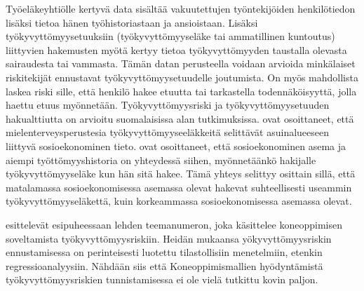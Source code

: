 Työeläkeyhtiölle kertyvä data sisältää vakuutettujen työntekijöiden henkilötiedon lisäksi tietoa hänen työhistoriastaan ja ansioistaan. Lisäksi työkyvyttömyysetuuksiin (työkyvyttömyyseläke tai ammatillinen kuntoutus) liittyvien hakemusten myötä kertyy tietoa työkyvyttömyyden taustalla olevasta sairaudesta tai vammasta. Tämän datan perusteella voidaan arvioida minkälaiset riskitekijät ennustavat työkyvyttömyysetuudelle joutumista. On myös mahdollista laskea riski sille, että henkilö hakee etuutta tai tarkastella todennäköisyyttä, jolla haettu etuus myönnetään. Työkyvyttömyysriski ja työkyvyttömyysetuuden hakualttiutta on arvioitu suomalaisissa alan tutkimuksissa. \citet{karolaakso_contextual_2021, karolaakso_socioeconomic_2020} ovat osoittaneet, että mielenterveysperustesia työkyvyttömyyseeläkkeitä selittävät asuinalueeseen liittyvä sosioekonominen tieto. \citet{perhoniemi_determinants_2020, perhoniemi_tyokyvyttomyyselakehakemusten_2020} ovat osoittaneet, että sosioekonominen asema ja aiempi työttömyyshistoria on yhteydessä siihen, myönnetäänkö hakijalle työkyvyttömyyseläke kun hän sitä hakee. Tämä yhteys selittyy osittain sillä, että matalamassa sosioekonomisessa asemassa olevat hakevat suhteellisesti useammin työkyvyttömyyseläkettä, kuin korkeammassa sosioekonomisessa asemassa olevat.

\citet{gross_machine_2020} esittelevät esipuheessaan lehden teemanumeron, joka käsittelee koneoppimisen soveltamista työkyvyttömyysriskiin. Heidän mukaansa yökyvyttömyysriskin ennustamisessa on perinteisesti luotettu tilastollisiin menetelmiin, etenkin regressioanalyysiin. Nähdään siis että Koneoppimismallien hyödyntämistä työkyvyttömyysriskien tunnistamisessa ei ole vielä tutkittu kovin paljon. 

